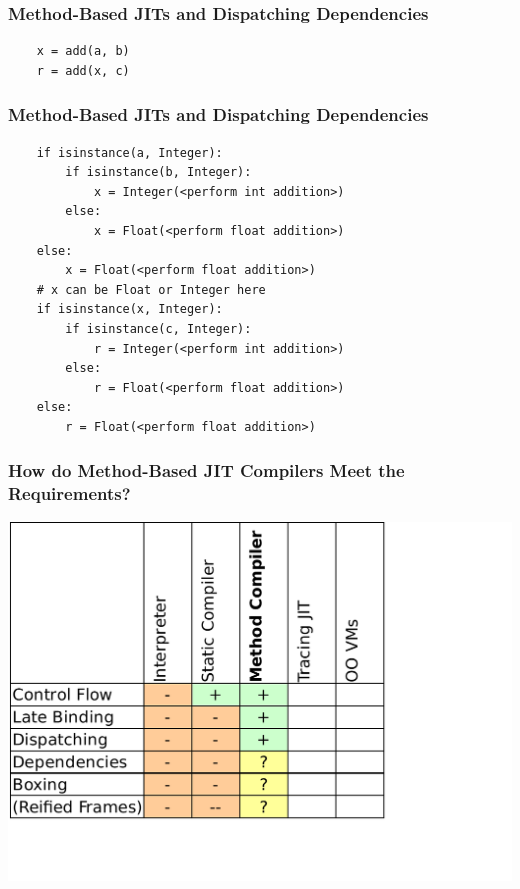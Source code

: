 \documentclass[utf8x]{beamer}
\begin{document}
\begin{frame}[containsverbatim]
  \frametitle{Method-Based JITs and Dispatching Dependencies}
\begin{verbatim}
    x = add(a, b)
    r = add(x, c)
\end{verbatim}
\end{frame}

\begin{frame}
  \frametitle{Method-Based JITs and Dispatching Dependencies}
\begin{verbatim}
    if isinstance(a, Integer):
        if isinstance(b, Integer):
            x = Integer(<perform int addition>)
        else:
            x = Float(<perform float addition>)
    else:
        x = Float(<perform float addition>)
    # x can be Float or Integer here
    if isinstance(x, Integer):
        if isinstance(c, Integer):
            r = Integer(<perform int addition>)
        else:
            r = Float(<perform float addition>)
    else:
        r = Float(<perform float addition>)
\end{verbatim}
\end{frame}

\begin{frame}
  \frametitle{How do Method-Based JIT Compilers Meet the Requirements?}
  \includegraphics[scale=0.6]{figures/output3.pdf}
\end{frame}
\end{document}
